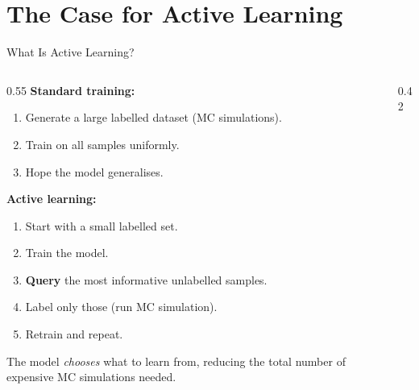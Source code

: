 \documentclass[aspectratio=169, 10pt]{beamer}
\begin{document}
\section{The Case for Active Learning}

\begin{frame}{What Is Active Learning?}
  \begin{columns}[T]
    \begin{column}{0.55\textwidth}
      \textbf{Standard training:}
      \begin{enumerate}
        \item Generate a large labelled dataset (MC simulations).
        \item Train on all samples uniformly.
        \item Hope the model generalises.
      \end{enumerate}

      \vspace{6pt}
      \textbf{Active learning:}
      \begin{enumerate}
        \item Start with a small labelled set.
        \item Train the model.
        \item \textbf{Query} the most informative unlabelled samples.
        \item Label only those (run MC simulation).
        \item Retrain and repeat.
      \end{enumerate}

      \vspace{4pt}
      {\small The model \emph{chooses} what to learn from, reducing
       the total number of expensive MC simulations needed.}
    \end{column}
    \begin{column}{0.42\textwidth}
      \begin{center}
      \end{center}
    \end{column}
  \end{columns}
\end{frame}
\end{document}
